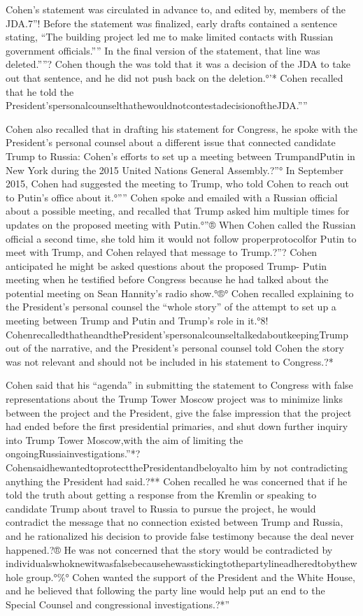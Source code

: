 Cohen's statement was circulated in advance to, and edited by, members of the JDA.7”! Before the statement was finalized, early drafts contained a sentence stating, “The building project led me to make limited contacts with Russian government officials.”” In the final version of the statement, that line was deleted.””? Cohen though the was told that it was a decision of the JDA to take out that sentence, and he did not push back on the deletion.°'* Cohen recalled that he told the President'spersonalcounselthathewouldnotcontestadecisionoftheJDA.””

Cohen also recalled that in drafting his statement for Congress, he spoke with the President's personal counsel about a different issue that connected candidate Trump to Russia: Cohen's efforts to set up a meeting between TrumpandPutin in New York during the 2015 United Nations General Assembly.?”° In September 2015, Cohen had suggested the meeting to Trump, who told Cohen to reach out to Putin's office about it.°”” Cohen spoke and emailed with a Russian official about a possible meeting, and recalled that Trump asked him multiple times for updates on the proposed meeting with Putin.°”® When Cohen called the Russian official a second time, she told him it would not follow properprotocolfor Putin to meet with Trump, and Cohen relayed that message to Trump.?”? Cohen anticipated he might be asked questions about the proposed Trump- Putin meeting when he testified before Congress because he had talked about the potential meeting on Sean Hannity's radio show.°®° Cohen recalled explaining to the President's personal counsel the “whole story” of the attempt to set up a meeting between Trump and Putin and Trump's role in it.°8! CohenrecalledthatheandthePresident'spersonalcounseltalkedaboutkeepingTrump out of the narrative, and the President's personal counsel told Cohen the story was not relevant and should not be included in his statement to Congress.?*

Cohen said that his “agenda” in submitting the statement to Congress with false representations about the Trump Tower Moscow project was to minimize links between the project and the President, give the false impression that the project had ended before the first presidential primaries, and shut down further inquiry into Trump Tower Moscow,with the aim of limiting the ongoingRussiainvestigations.”*? CohensaidhewantedtoprotectthePresidentandbeloyalto him by not contradicting anything the President had said.?** Cohen recalled he was concerned that if he told the truth about getting a response from the Kremlin or speaking to candidate Trump about travel to Russia to pursue the project, he would contradict the message that no connection existed between Trump and Russia, and he rationalized his decision to provide false testimony because the deal never happened.?® He was not concerned that the story would be contradicted by individualswhoknewitwasfalsebecausehewasstickingtothepartylineadheredtobythewhole group.°\%° Cohen wanted the support of the President and the White House, and he believed that following the party line would help put an end to the Special Counsel and congressional investigations.?*”

